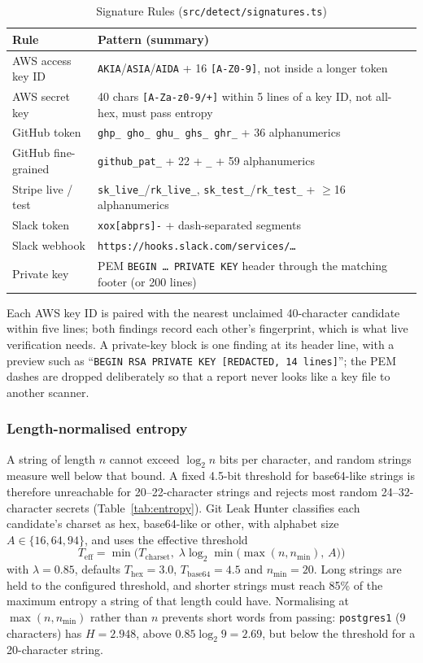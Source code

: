 \documentclass[conference]{IEEEtran}
\newcommand{\tool}{Git Leak Hunter}
\newcommand{\code}[1]{\texttt{#1}}
\begin{document}
\begin{table}[t]
\centering
\caption{Signature Rules (\code{src/detect/signatures.ts})}
\label{tab:signatures}
\footnotesize
\begin{tabular}{@{}P{24mm}P{56mm}@{}}
\toprule
Rule & Pattern (summary) \\
\midrule
AWS access key ID & \code{AKIA}/\code{ASIA}/\code{AIDA} + 16 \code{[A-Z0-9]}, not inside a longer token \\
AWS secret key & 40 chars \code{[A-Za-z0-9/+]} within 5 lines of a key ID, not all-hex, must pass entropy \\
GitHub token & \code{ghp\_ gho\_ ghu\_ ghs\_ ghr\_} + 36 alphanumerics \\
GitHub fine-grained & \code{github\_pat\_} + 22 + \code{\_} + 59 alphanumerics \\
Stripe live / test & \code{sk\_live\_}/\code{rk\_live\_}, \code{sk\_test\_}/\code{rk\_test\_} + $\geq$16 alphanumerics \\
Slack token & \code{xox[abprs]-} + dash-separated segments \\
Slack webhook & \code{https://hooks.slack.com/services/\ldots} \\
Private key & PEM \code{BEGIN \ldots{} PRIVATE KEY} header through the matching footer (or 200 lines) \\
\bottomrule
\end{tabular}
\end{table}

Each AWS key ID is paired with the nearest unclaimed 40-character candidate within five lines;
both findings record each other's fingerprint, which is what live verification needs. A
private-key block is one finding at its header line, with a preview such as
``\code{BEGIN RSA PRIVATE KEY [REDACTED, 14 lines]}''; the PEM dashes are dropped deliberately so
that a report never looks like a key file to another scanner.

\subsubsection{Length-normalised entropy}
A string of length $n$ cannot exceed $\log_2 n$ bits per character, and random strings measure
well below that bound. A fixed 4.5-bit threshold for base64-like strings is therefore unreachable
for 20--22-character strings and rejects most random 24--32-character secrets
(Table~\ref{tab:entropy}). \tool{} classifies each candidate's charset as hex, base64-like or
other, with alphabet size $A\in\{16,64,94\}$, and uses the effective threshold
\begin{equation}
T_{\text{eff}} = \min\!\Big(T_{\text{charset}},\; \lambda \log_2 \min\big(\max(n, n_{\min}),\, A\big)\Big)
\label{eq:teff}
\end{equation}
with $\lambda = 0.85$, defaults $T_{\text{hex}}=3.0$, $T_{\text{base64}}=4.5$ and $n_{\min}=20$.
Long strings are held to the configured threshold, and shorter strings must reach 85\% of the
maximum entropy a string of that length could have. Normalising at $\max(n,n_{\min})$ rather than
$n$ prevents short words from passing: \code{postgres1} (9 characters) has $H=2.948$, above
$0.85\log_2 9 = 2.69$, but below the threshold for a 20-character string.
\end{document}
